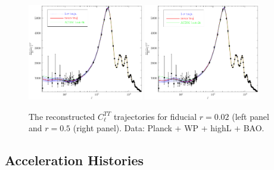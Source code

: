 \documentclass[11pt]{article}
\def \halffigwidth{0.45\textwidth}
\begin{document}
\begin{figure}
\includegraphics[width = \halffigwidth]{nobicep_spline0_p11_r0d5_clTT_trajs.pdf}%
\includegraphics[width = \halffigwidth]{spline0_p11_clTT_trajs.pdf}
\caption{The reconstructed $C_\ell^{TT}$ trajectories for fiducial $r=0.02$ (left panel and $r=0.5$ (right panel). Data: Planck + WP + highL + BAO.\label{fig:traj_cltt}}
\end{figure}



\subsection{Acceleration Histories}
\end{document}
